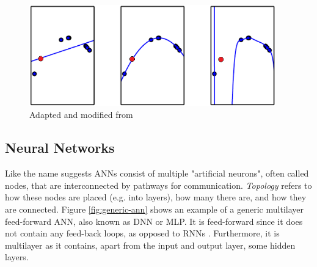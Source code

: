

\begin{figure}[ht]
    \centering
    \includegraphics[width=0.95\textwidth]{img/overfitting-vs-underfitting}
    \caption{Adapted and modified from \cite[Fig. 5.2]{Goodfellow2016}}
    \label{fig:over-vs-under}
\end{figure}

\subsection{Neural Networks}
Like the name suggests \acp{ANN} consist of multiple "artificial neurons", often called nodes, that are interconnected by pathways for communication.
\textit{Topology} refers to how these nodes are placed (e.g. into layers), how many there are, and how they are connected.
Figure \ref{fig:generic-ann} shows an example of a generic multilayer feed-forward \ac{ANN}, also known as \ac{DNN} or \ac{MLP}.
It is feed-forward since it does not contain any feed-back loops, as opposed to \acp{RNN} \cite{Goodfellow2016, Haykin2009}. Furthermore, it is multilayer as it contains, apart from the input and output layer, some hidden layers.

